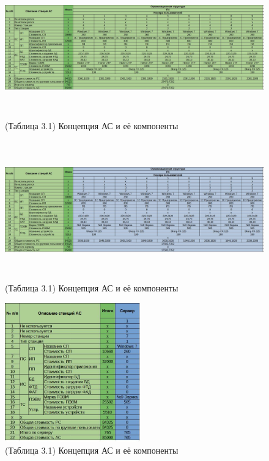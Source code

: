 \documentclass[12pt, a4paper, simple]{eskdtext}
\begin{document}
    \begin{figure}[!hp]
        \centering
        \includegraphics[height=6cm]
            {_docs/КонцепцияАСИЕеКомпонентыП4.jpg}
        \caption{(Таблица 3.1) Концепция АС и её компоненты}
    \end{figure}

    \begin{figure}[!hp]
        \centering
        \includegraphics[height=6cm]
            {_docs/КонцепцияАСИЕеКомпонентыП5.jpg}
        \caption{(Таблица 3.1) Концепция АС и её компоненты}
    \end{figure}

    \begin{figure}[!hp]
        \centering
        \includegraphics[height=6cm]
            {_docs/КонцепцияАСИЕеКомпонентыСС1.jpg}
        \caption{(Таблица 3.1) Концепция АС и её компоненты}
    \end{figure}
    
\end{document}
